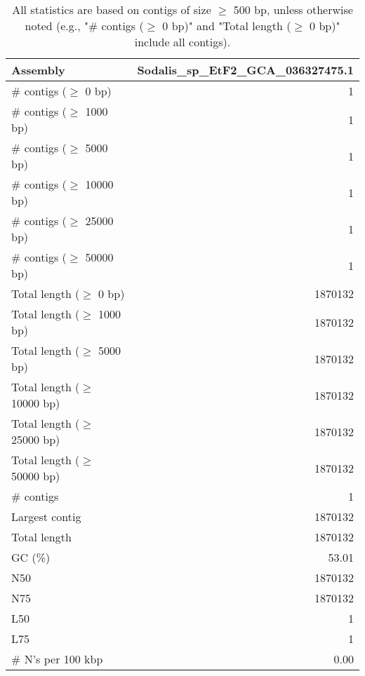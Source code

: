 \documentclass[12pt,a4paper]{article}
\begin{document}
\begin{table}[ht]
\begin{center}
\caption{All statistics are based on contigs of size $\geq$ 500 bp, unless otherwise noted (e.g., "\# contigs ($\geq$ 0 bp)" and "Total length ($\geq$ 0 bp)" include all contigs).}
\begin{tabular}{|l*{1}{|r}|}
\hline
Assembly & Sodalis\_sp\_EtF2\_GCA\_036327475.1 \\ \hline
\# contigs ($\geq$ 0 bp) & 1 \\ \hline
\# contigs ($\geq$ 1000 bp) & 1 \\ \hline
\# contigs ($\geq$ 5000 bp) & 1 \\ \hline
\# contigs ($\geq$ 10000 bp) & 1 \\ \hline
\# contigs ($\geq$ 25000 bp) & 1 \\ \hline
\# contigs ($\geq$ 50000 bp) & 1 \\ \hline
Total length ($\geq$ 0 bp) & 1870132 \\ \hline
Total length ($\geq$ 1000 bp) & 1870132 \\ \hline
Total length ($\geq$ 5000 bp) & 1870132 \\ \hline
Total length ($\geq$ 10000 bp) & 1870132 \\ \hline
Total length ($\geq$ 25000 bp) & 1870132 \\ \hline
Total length ($\geq$ 50000 bp) & 1870132 \\ \hline
\# contigs & 1 \\ \hline
Largest contig & 1870132 \\ \hline
Total length & 1870132 \\ \hline
GC (\%) & 53.01 \\ \hline
N50 & 1870132 \\ \hline
N75 & 1870132 \\ \hline
L50 & 1 \\ \hline
L75 & 1 \\ \hline
\# N's per 100 kbp & 0.00 \\ \hline
\end{tabular}
\end{center}
\end{table}
\end{document}
